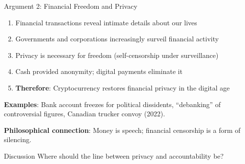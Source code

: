 ﻿\documentclass[aspectratio=169,11pt]{beamer}
\begin{document}
\begin{frame}{Argument 2: Financial Freedom and Privacy}
\begin{probox}
\begin{enumerate}
    \item Financial transactions reveal intimate details about our lives
    \item Governments and corporations increasingly surveil financial activity
    \item Privacy is necessary for freedom (self-censorship under surveillance)
    \item Cash provided anonymity; digital payments eliminate it
    \item \textbf{Therefore}: Cryptocurrency restores financial privacy in the digital age
\end{enumerate}
\end{probox}

\vspace{0.3em}
\textbf{Examples}: Bank account freezes for political dissidents, ``debanking'' of controversial figures, Canadian trucker convoy (2022).

\textbf{Philosophical connection}: Money is speech; financial censorship is a form of silencing.

\begin{alertblock}{Discussion}
Where should the line between privacy and accountability be?
\end{alertblock}
\end{frame}
\end{document}
